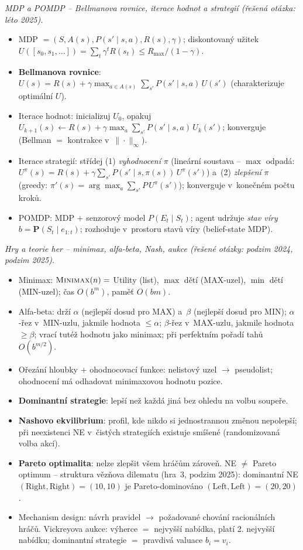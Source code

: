 \begin{poznamka}
\smallskip
\emph{MDP a POMDP -- Bellmanova rovnice, iterace hodnot a strategií (řešená otázka: léto 2025).}
\begin{itemize}
  \item MDP $= (S, A(s), P(s'\mid s,a), R(s), \gamma)$; diskontovaný užitek $U([s_0,s_1,\ldots])=\sum_t\gamma^t R(s_t)\le R_{\max}/(1-\gamma)$.
  \item \textbf{Bellmanova rovnice}: $U(s)=R(s)+\gamma\max_{a\in A(s)}\sum_{s'}P(s'\mid s,a)\,U(s')$ (charakterizuje optimální $U$).
  \item Iterace hodnot: inicializuj $U_0$, opakuj $U_{k+1}(s)\leftarrow R(s)+\gamma\max_a\sum_{s'}P(s'\mid s,a)\,U_k(s')$; konverguje (Bellman $=$ kontrakce v~$\|\cdot\|_\infty$).
  \item Iterace strategií: střídej (1) \emph{vyhodnocení} $\pi$ (lineární soustava -- $\max$ odpadá: $U^\pi(s)=R(s)+\gamma\sum_{s'}P(s'\mid s,\pi(s))\,U^\pi(s')$) a~(2) \emph{zlepšení} $\pi$ (greedy: $\pi'(s)=\arg\max_a\sum_{s'}P\,U^\pi(s')$); konverguje v~konečném počtu kroků.
  \item POMDP: MDP $+$ senzorový model $P(E_t\mid S_t)$; agent udržuje \emph{stav víry} $b=\mathbf{P}(S_t\mid e_{1:t})$; rozhoduje v~prostoru stavů víry (belief-state MDP).
\end{itemize}

\smallskip
\emph{Hry a teorie her -- minimax, alfa-beta, Nash, aukce (řešené otázky: podzim 2024, podzim 2025).}
\begin{itemize}
  \item Minimax: $\textsc{Minimax}(n)=$ Utility (list), $\max$ dětí (MAX-uzel), $\min$ dětí (MIN-uzel); čas $O(b^m)$, paměť $O(bm)$.
  \item Alfa-beta: drží $\alpha$ (nejlepší dosud pro MAX) a~$\beta$ (nejlepší dosud pro MIN); $\alpha$\nobreakdash-řez v~MIN-uzlu, jakmile hodnota $\le\alpha$; $\beta$\nobreakdash-řez v~MAX-uzlu, jakmile hodnota $\ge\beta$; vrací tutéž hodnotu jako minimax; při perfektním pořadí tahů $O(b^{m/2})$.
  \item Ořezání hloubky $+$ ohodnocovací funkce: nelistový uzel $\to$ pseudolist; ohodnocení má odhadovat minimaxovou hodnotu pozice.
  \item \textbf{Dominantní strategie}: lepší než každá jiná bez ohledu na volbu soupeře.
  \item \textbf{Nashovo ekvilibrium}: profil, kde nikdo si jednostrannou změnou nepolepší; při neexistenci NE v~čistých strategiích existuje smíšené (randomizovaná volba akcí).
  \item \textbf{Pareto optimalita}: nelze zlepšit všem hráčům zároveň. NE $\neq$ Pareto optimum -- struktura vězňova dilematu (hra~3, podzim 2025): dominantní NE $(\mathrm{Right},\mathrm{Right})=(10,10)$ je Pareto-dominováno $(\mathrm{Left},\mathrm{Left})=(20,20)$.
  \item Mechanism design: návrh pravidel $\to$ požadované chování racionálních hráčů. Vickreyova aukce: výherce $=$ nejvyšší nabídka, platí 2. nejvyšší nabídku; dominantní strategie $=$ pravdivá valuace $b_i=v_i$.
\end{itemize}


\end{poznamka}
